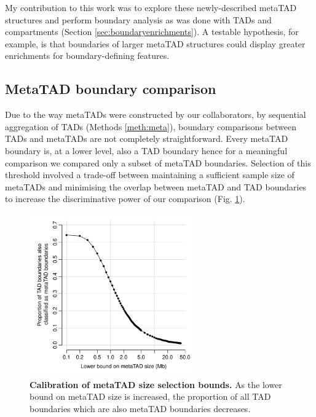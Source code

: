\documentclass[a4paper,11pt,oneside]{book}
\begin{document}
My contribution to this work was to explore these newly-described metaTAD structures and perform boundary analysis as was done with TADs and compartments (Section \ref{sec:boundaryenrichments}). A testable hypothesis, for example, is that boundaries of larger metaTAD structures could display greater enrichments for boundary-defining features.

\subsection{MetaTAD boundary comparison}\label{sec:metaVtad}

Due to the way metaTADs were constructed by our collaborators, by sequential aggregation of TADs (Methods \ref{meth:meta}), boundary comparisons between TADs and metaTADs are not completely straightforward. Every metaTAD boundary is, at a lower level, also a TAD boundary hence for a meaningful comparison we compared only a subset of metaTAD boundaries. Selection of this threshold involved a trade-off between maintaining a sufficient sample size of metaTADs and minimising the overlap between metaTAD and TAD boundaries to increase the discriminative power of our comparison (Fig. \ref{fig:mtcalibrate}).

\begin{figure}
\begin{center} 
\includegraphics[width=2.75in]{figs/mt_calibrate.pdf}
\captionsetup{width=\textwidth}
\caption[Calibration of metaTAD size selection bounds.]{ {\bf Calibration of metaTAD size selection bounds. }
As the lower bound on metaTAD size is increased, the proportion of all TAD boundaries which are also metaTAD boundaries decreases.
}\label{fig:mtcalibrate}
\end{center}
\end{figure} 
\end{document}
